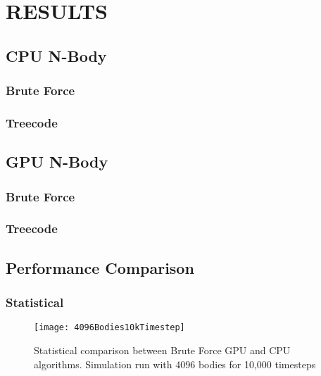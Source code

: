 \documentclass{thesis}
\begin{document}
\chapter{RESULTS}
\section{CPU N-Body}
\subsection{Brute Force}
\subsection{Treecode}
\section{GPU N-Body}
\subsection{Brute Force}
\subsection{Treecode}
\section{Performance Comparison}
\subsection{Statistical}
\begin{figure}[h]
    \caption{Statistical comparison between Brute Force GPU and CPU algorithms. Simulation run with 4096 bodies for 10,000 timesteps}
    \label{fig:test}
    \centering
    \texttt{[image: 4096Bodies10kTimestep]}
\end{figure}
\end{document}
